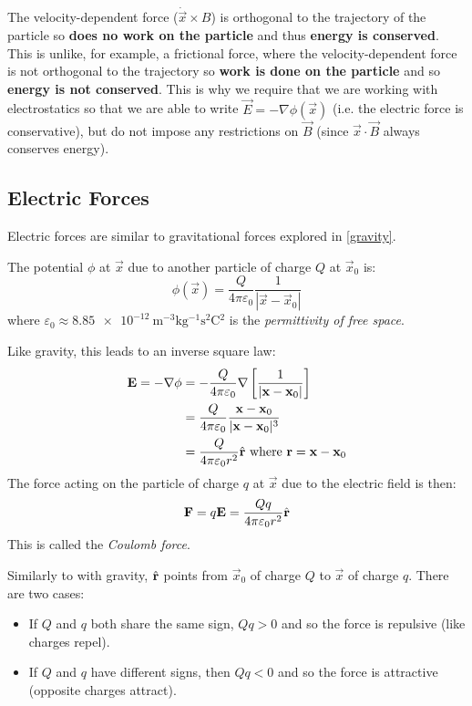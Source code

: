 \documentclass[../main.tex]{subfiles}
\begin{document}
The velocity-dependent force ($\dot{\vec{x}} \times B$) is orthogonal to the trajectory of the particle so \textbf{does no work on the particle} and thus \textbf{energy is conserved}.
This is unlike, for example, a frictional force, where the velocity-dependent force is not orthogonal to the trajectory so \textbf{work is done on the particle} and so \textbf{energy is not conserved}.
This is why we require that we are working with electrostatics so that we are able to write $\vec{E} = - \nabla \phi (\vec{x})$ (i.e. the electric force is conservative), but do not impose any restrictions on $\vec{B}$ (since $\vec{x} \cdot \vec{B}$ always conserves energy).
\subsection{Electric Forces}
\label{electricForces}
Electric forces are similar to gravitational forces explored in \cref{gravity}.

The potential $\phi$ at $\vec{x}$ due to another particle of charge $Q$ at $\vec{x}_0$ is:
\[
  \phi(\vec{x}) = \frac{Q}{4\pi \varepsilon_0} \frac{1}{|\vec{x} - \vec{x}_0|}
\]
where $\varepsilon_0 \approx \qty{8.85e-12}{\metre^{-3}\kilogram^{-1}\second^2\coulomb^2}$ is the \textit{permittivity of free space}.

Like gravity, this leads to an inverse square law:
\begin{align*}
  \mathbf{\bm{E}} = -\nabla \phi &= -\frac{Q}{4\pi\varepsilon_0} \nabla\left[\frac{1}{|\mathbf{\bm{x}} - \mathbf{\bm{x}}_0|}\right] \\
                   &= \frac{Q}{4\pi\varepsilon_0} \frac{\mathbf{\bm{x}} - \mathbf{\bm{x}}_0}{|\mathbf{\bm{x}} - \mathbf{\bm{x}}_0|^3} \\
                   &= \frac{Q}{4\pi\varepsilon_0 r^2} \hat{\mathbf{\bm{r}}} \text{ where $\mathbf{\bm{r}} = \mathbf{\bm{x}} - \mathbf{\bm{x}}_0$}
\end{align*}
The force acting on the particle of charge $q$ at $\vec{x}$ due to the electric field is then:
\[
  \mathbf{\bm{F}} = q\mathbf{\bm{E}} = \frac{Qq}{4\pi\varepsilon_0 r^2} \hat{\mathbf{\bm{r}}}
\]
This is called the \textit{Coulomb force}.

Similarly to with gravity, $\hat{\mathbf{\bm{r}}}$ points from $\vec{x}_0$ of charge $Q$ to $\vec{x}$ of charge $q$.
There are two cases:
\begin{itemize}
  \item If $Q$ and $q$ both share the same sign, $Qq > 0$ and so the force is repulsive (like charges repel).
  \item If $Q$ and $q$ have different signs, then $Qq < 0$ and so the force is attractive (opposite charges attract).
\end{itemize}
\end{document}
